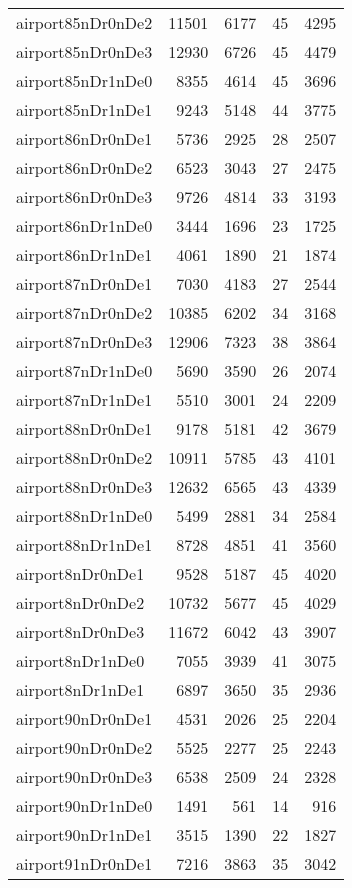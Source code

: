 \begin{longtable}{lrrrr}
airport85nDr0nDe2 & 11501 & 6177 & 45 & 4295 \\
airport85nDr0nDe3 & 12930 & 6726 & 45 & 4479 \\
airport85nDr1nDe0 & 8355 & 4614 & 45 & 3696 \\
airport85nDr1nDe1 & 9243 & 5148 & 44 & 3775 \\
airport86nDr0nDe1 & 5736 & 2925 & 28 & 2507 \\
airport86nDr0nDe2 & 6523 & 3043 & 27 & 2475 \\
airport86nDr0nDe3 & 9726 & 4814 & 33 & 3193 \\
airport86nDr1nDe0 & 3444 & 1696 & 23 & 1725 \\
airport86nDr1nDe1 & 4061 & 1890 & 21 & 1874 \\
airport87nDr0nDe1 & 7030 & 4183 & 27 & 2544 \\
airport87nDr0nDe2 & 10385 & 6202 & 34 & 3168 \\
airport87nDr0nDe3 & 12906 & 7323 & 38 & 3864 \\
airport87nDr1nDe0 & 5690 & 3590 & 26 & 2074 \\
airport87nDr1nDe1 & 5510 & 3001 & 24 & 2209 \\
airport88nDr0nDe1 & 9178 & 5181 & 42 & 3679 \\
airport88nDr0nDe2 & 10911 & 5785 & 43 & 4101 \\
airport88nDr0nDe3 & 12632 & 6565 & 43 & 4339 \\
airport88nDr1nDe0 & 5499 & 2881 & 34 & 2584 \\
airport88nDr1nDe1 & 8728 & 4851 & 41 & 3560 \\
airport8nDr0nDe1 & 9528 & 5187 & 45 & 4020 \\
airport8nDr0nDe2 & 10732 & 5677 & 45 & 4029 \\
airport8nDr0nDe3 & 11672 & 6042 & 43 & 3907 \\
airport8nDr1nDe0 & 7055 & 3939 & 41 & 3075 \\
airport8nDr1nDe1 & 6897 & 3650 & 35 & 2936 \\
airport90nDr0nDe1 & 4531 & 2026 & 25 & 2204 \\
airport90nDr0nDe2 & 5525 & 2277 & 25 & 2243 \\
airport90nDr0nDe3 & 6538 & 2509 & 24 & 2328 \\
airport90nDr1nDe0 & 1491 & 561 & 14 & 916 \\
airport90nDr1nDe1 & 3515 & 1390 & 22 & 1827 \\
airport91nDr0nDe1 & 7216 & 3863 & 35 & 3042 \\

\end{longtable}
